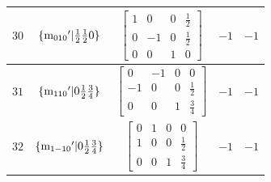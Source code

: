 \documentclass[fleqn,8pt]{jsarticle}
\begin{document}
\begin{longtable}{ccccc}
$ 30 $ & $ \{{\rm m}_{010}{}'|\frac{1}{2} \frac{1}{2} 0\} $ & $ \begin{bmatrix} 1 & 0 & 0 & \frac{1}{2} \\ 0 & -1 & 0 & \frac{1}{2} \\ 0 & 0 & 1 & 0 \end{bmatrix} $ & $ -1 $ & $ -1 $ \\ \hline
$ 31 $ & $ \{{\rm m}_{110}{}'|0 \frac{1}{2} \frac{3}{4}\} $ & $ \begin{bmatrix} 0 & -1 & 0 & 0 \\ -1 & 0 & 0 & \frac{1}{2} \\ 0 & 0 & 1 & \frac{3}{4} \end{bmatrix} $ & $ -1 $ & $ -1 $ \\ \hline
$ 32 $ & $ \{{\rm m}_{1-10}{}'|0 \frac{1}{2} \frac{3}{4}\} $ & $ \begin{bmatrix} 0 & 1 & 0 & 0 \\ 1 & 0 & 0 & \frac{1}{2} \\ 0 & 0 & 1 & \frac{3}{4} \end{bmatrix} $ & $ -1 $ & $ -1 $ \\
\end{longtable}
\end{document}
